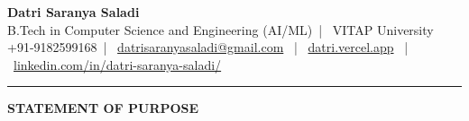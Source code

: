 \documentclass[a4paper,11pt]{article}
\makeatletter
\newcommand{\name}{Datri Saranya Saladi}
\newcommand{\course}{B.Tech in Computer Science and Engineering (AI/ML)}
\newcommand{\phone}{9182599168}
\newcommand{\emaild}{datrisaranyasaladi@gmail.com}
\makeatother
\begin{document}
\selectfont

\begin{center}
    \textbf{\LARGE \name} \\ \vspace{4pt}
    \small \course \ | \ VITAP University \\ \vspace{2pt}
    \small +91-\phone \ | \ \href{mailto:\emaild}{\emaild} \ | \ \href{https://datri.vercel.app/}{datri.vercel.app} \ | \ \href{https://www.linkedin.com/in/datri-saranya-saladi/}{linkedin.com/in/datri-saranya-saladi/}
\end{center}
\vspace{10pt}
\hrule
\vspace{15pt}

\begin{center}
    \textbf{\Large STATEMENT OF PURPOSE}
\end{center}
\vspace{15pt}
\end{document}
